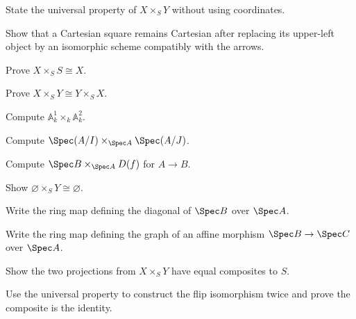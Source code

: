 \begin{exercise}\label{exr:vi23-01}
State the universal property of $X\times_SY$ without using coordinates.
\end{exercise}

\begin{exercise}\label{exr:vi23-02}
Show that a Cartesian square remains Cartesian after replacing its upper-left object by an isomorphic scheme compatibly with the arrows.
\end{exercise}

\begin{exercise}\label{exr:vi23-03}
Prove $X\times_SS\cong X$.
\end{exercise}

\begin{exercise}\label{exr:vi23-04}
Prove $X\times_SY\cong Y\times_SX$.
\end{exercise}

\begin{exercise}\label{exr:vi23-05}
Compute $\mathbb A^1_k\times_k\mathbb A^2_k$.
\end{exercise}

\begin{exercise}\label{exr:vi23-06}
Compute $\Spec(A/I)\times_{\Spec A}\Spec(A/J)$.
\end{exercise}

\begin{exercise}\label{exr:vi23-07}
Compute $\Spec B\times_{\Spec A}D(f)$ for $A\to B$.
\end{exercise}

\begin{exercise}\label{exr:vi23-08}
Show $\varnothing\times_SY\cong\varnothing$.
\end{exercise}

\begin{exercise}\label{exr:vi23-09}
Write the ring map defining the diagonal of $\Spec B$ over $\Spec A$.
\end{exercise}

\begin{exercise}\label{exr:vi23-10}
Write the ring map defining the graph of an affine morphism $\Spec B\to\Spec C$ over $\Spec A$.
\end{exercise}

\begin{exercise}\label{exr:vi23-11}
Show the two projections from $X\times_SY$ have equal composites to $S$.
\end{exercise}

\begin{exercise}\label{exr:vi23-12}
Use the universal property to construct the flip isomorphism twice and prove the composite is the identity.
\end{exercise}

